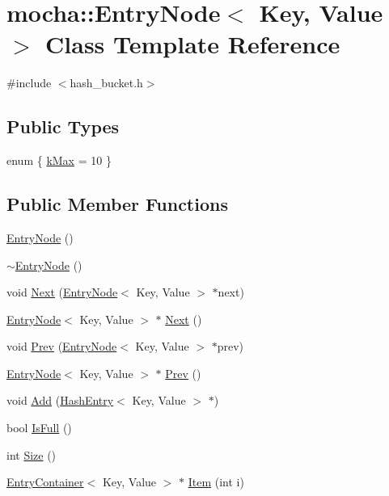 \hypertarget{classmocha_1_1_entry_node}{
\section{mocha::EntryNode$<$ Key, Value $>$ Class Template Reference}
\label{classmocha_1_1_entry_node}
}


{\ttfamily \#include $<$hash\_\-bucket.h$>$}

\subsection*{Public Types}
\begin{DoxyCompactItemize}
\item 
enum \{ \hyperlink{classmocha_1_1_entry_node_a903ff829823f6d2ffc816134b685d249a0dc13ddec2296670a5855615141bf99c}{kMax} =  10
 \}
\end{DoxyCompactItemize}
\subsection*{Public Member Functions}
\begin{DoxyCompactItemize}
\item 
\hyperlink{classmocha_1_1_entry_node_af96045dd310ba9914e5c22579f17b595}{EntryNode} ()
\item 
\hyperlink{classmocha_1_1_entry_node_a86ba6135ea1f7591354f6d8d5e119bd7}{$\sim$EntryNode} ()
\item 
void \hyperlink{classmocha_1_1_entry_node_a16982236fbe3d161bc5e14de822b5111}{Next} (\hyperlink{classmocha_1_1_entry_node}{EntryNode}$<$ Key, Value $>$ $\ast$next)
\item 
\hyperlink{classmocha_1_1_entry_node}{EntryNode}$<$ Key, Value $>$ $\ast$ \hyperlink{classmocha_1_1_entry_node_af13343324dc3edc1f9b951b58dadc72b}{Next} ()
\item 
void \hyperlink{classmocha_1_1_entry_node_af349ab0631989671ac5ba02d05053301}{Prev} (\hyperlink{classmocha_1_1_entry_node}{EntryNode}$<$ Key, Value $>$ $\ast$prev)
\item 
\hyperlink{classmocha_1_1_entry_node}{EntryNode}$<$ Key, Value $>$ $\ast$ \hyperlink{classmocha_1_1_entry_node_a984f41a9a835669291a82d5b8da9e3aa}{Prev} ()
\item 
void \hyperlink{classmocha_1_1_entry_node_a45601d3e19c1f88fe4eccdb756154b7c}{Add} (\hyperlink{classmocha_1_1_hash_entry}{HashEntry}$<$ Key, Value $>$ $\ast$)
\item 
bool \hyperlink{classmocha_1_1_entry_node_af3e9f2f8c807f5e0b2c58b9b57d74626}{IsFull} ()
\item 
int \hyperlink{classmocha_1_1_entry_node_a991efeaa896fe680ee334050ec8b18e4}{Size} ()
\item 
\hyperlink{classmocha_1_1_entry_container}{EntryContainer}$<$ Key, Value $>$ $\ast$ \hyperlink{classmocha_1_1_entry_node_a290574518d474c66f4b59a8aae4bbfa0}{Item} (int i)
\end{DoxyCompactItemize}
